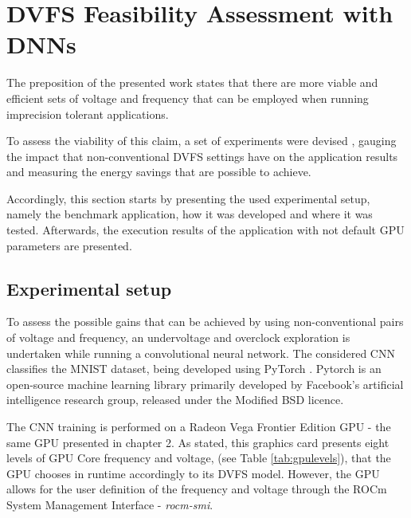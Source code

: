 \section{DVFS Feasibility Assessment with DNNs}
The preposition of the presented work states that there are more viable and efficient sets of voltage and frequency that can be employed when running imprecision tolerant applications. 

To assess the viability of this claim, a set of experiments were devised , gauging the impact that non-conventional DVFS settings have on the application results and measuring the energy savings that are possible to achieve.

Accordingly, this section starts by presenting the used experimental setup, namely the benchmark application, how it was developed and where it was tested. Afterwards, the execution results of the application with not default GPU parameters are presented.


\subsection{Experimental setup}
\label{section:experimental_setup}

To assess the possible gains that can be achieved by using non-conventional pairs of voltage and frequency, an undervoltage and overclock exploration is undertaken while running a convolutional neural network. The considered CNN classifies the MNIST dataset\cite{noauthor_mnist_1999}, being developed using PyTorch \cite{noauthor_pytorch_2016}. Pytorch is an open-source machine learning library primarily developed by Facebook's artificial intelligence research group, released under the Modified BSD licence.

The CNN training is performed on a Radeon Vega Frontier Edition GPU - the same GPU presented in chapter 2. As stated, this graphics card presents eight levels of GPU Core frequency and voltage, (see Table \ref{tab:gpulevels}), that the GPU chooses in runtime accordingly to its DVFS model. However, the GPU allows for the user definition of the frequency and voltage through the ROCm System Management Interface - \textit{rocm-smi}. 


